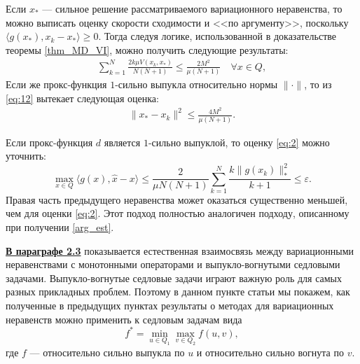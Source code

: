 \begin{remark}
    Если $x_*$ --- сильное решение рассматриваемого вариационного не\-равенства, то можно выписать оценку скорости сходимости и <<по аргументу>>, поскольку $\langle g(x_*), x_k - x_*\rangle \geq 0$. Тогда следуя логике, использованной в доказательстве теоремы \ref{thm_MD_VI}, можно получить следующие результаты: 
        \begin{equation} \label{eq:12}
        \begin{aligned} 
            \sum_{k=1}^{N} \frac{2k\mu V(x_k, x_*)}{N(N+1)} \leq \frac{2M^2}{\mu(N+1)} \quad  \forall x \in Q,
        \end{aligned}
        \end{equation}
    Если же прокс-функция $1$-сильно выпукла относительно нормы $\|\cdot\|$, то из \eqref{eq:12} вытекает следующая оценка:
        \begin{equation} 
        \begin{aligned} 
            \|x_* - x_k\|^2 \leq \frac{4M^2}{\mu(N+1)}.
        \end{aligned}
        \end{equation}
\end{remark}
\begin{remark}
    Если прокс-функция $d$ является $1$-сильно выпуклой, то оценку \eqref{eq:2} можно уточнить:
    \begin{equation}
        \max_{x \in Q} \langle g(x), \widehat{x} - x \rangle \leq \frac{2}{\mu N (N+1)} \sum_{k=1}^{N} \frac{k \|g(x_k)\|_*^2}{k+1} \leq \varepsilon.
    \end{equation}
    Правая часть предыдущего неравенства может оказаться существенно меньшей, чем для оценки \eqref{eq:2}. Этот подход полностью аналогичен подходу, описанному при получении \eqref{arg_est}.
\end{remark}

\underline{\textbf{В параграфе 2.3}} показывается естественная взаимосвязь между вариационными неравенствами с монотонными операторами и выпукло-вогнутыми седловыми задачами. Выпукло-вогнутые седловые задачи играют важную роль для самых разных прикладных проблем. Поэтому в данном пункте статьи мы покажем, как полученные в предыдущих пунктах результаты о методах для вариационных неравенств можно применить к седловым задачам вида
\begin{equation}\label{eqsedlo}
    f^* = \min_{u \in Q_1} \max_{v \in Q_2} f(u, v),
\end{equation}
где $f$ --- относительно сильно выпукла по $u$ и относительно сильно вогнута по $v$.

